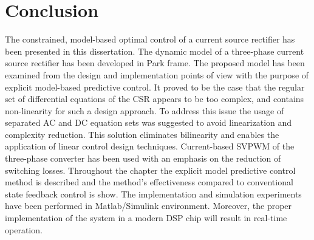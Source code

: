 \section{Conclusion}\label{EMPC:sec:Conclusions}

    The constrained, model-based optimal control of a current source rectifier has been presented in this dissertation. The dynamic model of a three-phase current source rectifier has been developed in Park frame. The proposed model has been examined from the design and implementation points of view with the purpose of explicit model-based predictive control. It proved to be the case that the regular set of differential equations of the CSR appears to be too complex, and contains non-linearity for such a design approach. To address this issue the usage of separated AC and DC equation sets was suggested to avoid linearization and complexity reduction. This solution eliminates bilinearity and enables the application of linear control design techniques. Current-based SVPWM of the three-phase converter has been used with an emphasis on the reduction of switching losses. Throughout the chapter the explicit model predictive control method is described and the method's effectiveness compared to conventional state feedback control is show. The implementation and simulation experiments have been performed in Matlab/Simulink environment. Moreover, the proper implementation of the system in a modern DSP chip will result in real-time operation. 